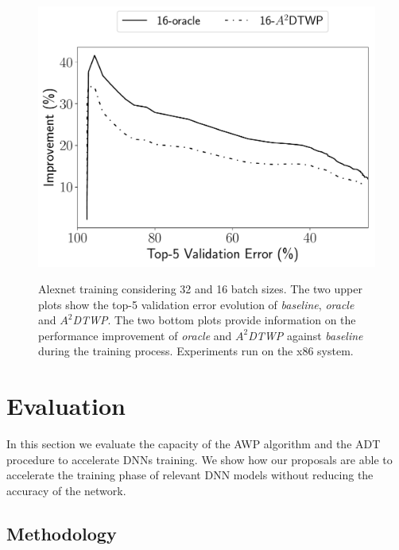 \begin{figure}[!bhtp]
{{            \includegraphics[scale=0.450]{figs/alex/small_3/alexnet_train_improvement_agg_top5_16-baseline.pdf}
        }
    }
    \caption{Alexnet training considering 32 and 16 batch sizes. The 
    two upper plots show the top-5 validation error evolution of
    \textit{baseline}, \textit{oracle} and \textit{$A^2$DTWP}.
    The two bottom plots provide information on the performance improvement of
    \textit{oracle} and \textit{$A^2$DTWP} against \textit{baseline}
    during the training process. Experiments run on the x86 system.
    }
        \label{alex_improv}
\end{figure}



\section{Evaluation}
\label{sec:evalutation}
In this section we evaluate the capacity of the AWP algorithm and the ADT procedure to accelerate DNNs training. 
We show how our proposals are able to accelerate the training phase of relevant DNN models without reducing the accuracy of the network. 

\subsection{Methodology}
\label{sec:evaluation1}

